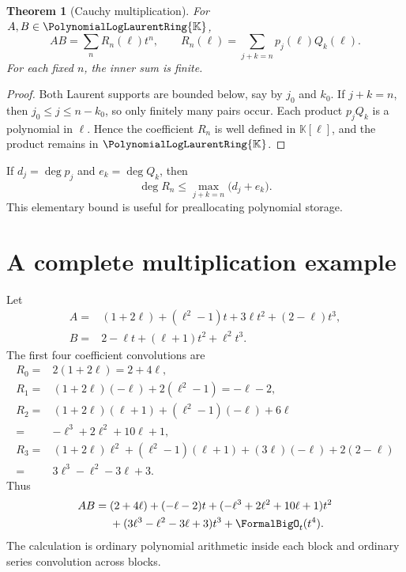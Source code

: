 \documentclass[11pt,oneside,openany]{book}
\newtheorem{theorem}{Theorem}[chapter]
\newcommand{\K}{\mathbb{K}}
\newcommand{\Pring}{\PolynomialLogLaurentRing{\K}}
\begin{document}
\begin{theorem}[Cauchy multiplication]\label{thm:cauchymult}
For \(A,B\in\Pring\),
\begin{equation}\label{eq:cauchy}
 AB=\sum_nR_n(\ell)t^n,
 \qquad
 R_n(\ell)=\sum_{j+k=n}p_j(\ell)Q_k(\ell).
\end{equation}
For each fixed \(n\), the inner sum is finite.
\end{theorem}

\begin{proof}
Both Laurent supports are bounded below, say by \(j_0\) and \(k_0\).  If
\(j+k=n\), then \(j_0\leq j\leq n-k_0\), so only finitely many pairs occur.
Each product \(p_jQ_k\) is a polynomial in \(\ell\).  Hence the coefficient
\(R_n\) is well defined in \(\K[\ell]\), and the product remains in \(\Pring\).
\end{proof}

If \(d_j=\deg p_j\) and \(e_k=\deg Q_k\), then
\begin{equation}\label{eq:degreeboundproduct}
 \deg R_n\leq
 \max_{j+k=n}\bigl(d_j+e_k\bigr).
\end{equation}
This elementary bound is useful for preallocating polynomial storage.

\section{A complete multiplication example}
Let
\begin{align*}
 A={}&(1+2\ell)+(\ell^2-1)t+3\ell t^2+(2-\ell)t^3,\\
 B={}&2-\ell t+(\ell+1)t^2+\ell^2t^3.
\end{align*}
The first four coefficient convolutions are
\begin{align*}
 R_0={}&2(1+2\ell)=2+4\ell,\\
 R_1={}&(1+2\ell)(-\ell)+2(\ell^2-1)=-\ell-2,\\
 R_2={}&(1+2\ell)(\ell+1)+(\ell^2-1)(-\ell)+6\ell\\
      ={}&-\ell^3+2\ell^2+10\ell+1,\\
 R_3={}&(1+2\ell)\ell^2+(\ell^2-1)(\ell+1)
          +(3\ell)(-\ell)+2(2-\ell)\\
      ={}&3\ell^3-\ell^2-3\ell+3.
\end{align*}
Thus
\begin{align}\label{eq:multworked}
 AB={}&(2+4\ell)+(-\ell-2)t
 +(-\ell^3+2\ell^2+10\ell+1)t^2\notag\\
 &+(3\ell^3-\ell^2-3\ell+3)t^3+\FormalBigO_t(t^4).
\end{align}
The calculation is ordinary polynomial arithmetic inside each block and
ordinary series convolution across blocks.
\end{document}
